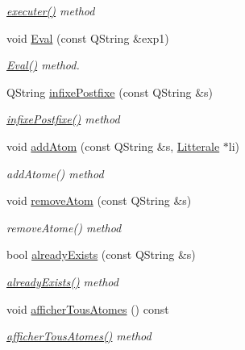 \begin{DoxyCompactItemize}
\begin{DoxyCompactList}\small\item\em \hyperlink{class_calculatrice_a18952ea12781a4b3ca6147ff10298db7}{executer()} method \end{DoxyCompactList}\item 
void \hyperlink{class_calculatrice_a579462aa5abe19ab51bd9b7e8fb9c5a1}{Eval} (const Q\+String \&exp1)
\begin{DoxyCompactList}\small\item\em \hyperlink{class_calculatrice_a579462aa5abe19ab51bd9b7e8fb9c5a1}{Eval()} method. \end{DoxyCompactList}\item 
Q\+String \hyperlink{class_calculatrice_a0fcf62f423e31fd182a74b76bb90e47d}{infixe\+Postfixe} (const Q\+String \&s)
\begin{DoxyCompactList}\small\item\em \hyperlink{class_calculatrice_a0fcf62f423e31fd182a74b76bb90e47d}{infixe\+Postfixe()} method \end{DoxyCompactList}\item 
void \hyperlink{class_calculatrice_ae6b03960bfed7c9d96893124acf2ae67}{add\+Atom} (const Q\+String \&s, \hyperlink{class_litterale}{Litterale} $\ast$li)
\begin{DoxyCompactList}\small\item\em add\+Atome() method \end{DoxyCompactList}\item 
void \hyperlink{class_calculatrice_a34ab6178729e5906fb38ccb09122f5b4}{remove\+Atom} (const Q\+String \&s)
\begin{DoxyCompactList}\small\item\em remove\+Atome() method \end{DoxyCompactList}\item 
bool \hyperlink{class_calculatrice_aeae79a2854c5341568391fe6399526c4}{already\+Exists} (const Q\+String \&s)
\begin{DoxyCompactList}\small\item\em \hyperlink{class_calculatrice_aeae79a2854c5341568391fe6399526c4}{already\+Exists()} method \end{DoxyCompactList}\item 
void \hyperlink{class_calculatrice_a8d75e506f620a940f66ab15583da6020}{afficher\+Tous\+Atomes} () const 
\begin{DoxyCompactList}\small\item\em \hyperlink{class_calculatrice_a8d75e506f620a940f66ab15583da6020}{afficher\+Tous\+Atomes()} method \end{DoxyCompactList}\end{DoxyCompactItemize}


